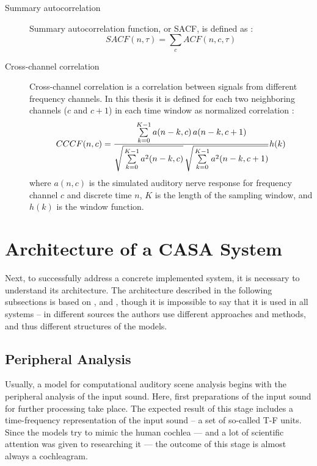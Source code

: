 \begin{description}
	\item[Summary autocorrelation] Summary autocorrelation function, or SACF, is defined as \cite{Wang2006}\cite{Wang2012}:
	\begin{equation}
		SACF(n, \tau) = \sum_c{ACF(n, c, \tau)}
		\label{equation:SACF}
	\end{equation}
	
	\item[Cross-channel correlation] Cross-channel correlation is a correlation between signals from different frequency channels. In this thesis it is defined for each two neighboring channels ($c$ and $c + 1$) in each time window as normalized correlation \cite{Wang2006}\cite{Wang2012}:
	\begin{equation}
		CCCF(n, c) = \frac{
			\sum\limits_{k=0}^{K-1}a(n - k, c)\,a(n - k, c + 1)
		}{
			\sqrt{\strut\sum\limits_{k=0}^{K-1}{a^2(n - k, c)}}\,
			\sqrt{\strut\sum\limits_{k=0}^{K-1}{a^2(n - k, c + 1)}}
		}h(k)
		\label{equation:CCCF}
	\end{equation}
	where $a(n, c)$ is the simulated auditory nerve response for frequency channel $c$ and discrete time $n$, $K$ is the length of the sampling window, and $h(k)$ is the window function.
\end{description}

\section{Architecture of a CASA System}\label{section:casa_architecture}

Next, to successfully address a concrete implemented system, it is necessary to understand its architecture. The architecture described in the following subsections is based on \cite{Wang2006}, \cite{Wang2012} and \cite{Jasti2020}, though it is impossible to say that it is used in all systems -- in different sources the authors use different approaches and methods, and thus different structures of the models.

\subsection{Peripheral Analysis}\label{subsection:casa_peripheral_analysis}

Usually, a model for computational auditory scene analysis begins with the peripheral analysis of the input sound. Here, first preparations of the input sound for further processing take place. The expected result of this stage includes a time-frequency representation of the input sound -- a set of so-called T-F units. Since the models try to mimic the human cochlea --- and a lot of scientific attention was given to researching it --- the outcome of this stage is almost always a cochleagram.\\

